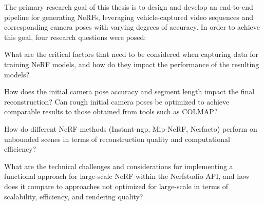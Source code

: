 The primary research goal of this thesis is to design and develop an end-to-end pipeline for generating NeRFs, leveraging vehicle-captured video sequences and corresponding camera poses with varying degrees of accuracy. In order to achieve this goal, four research questions were posed:


\begin{description}[leftmargin=!,labelwidth=\widthof{RQ 1:}]
\item[\textbf{RQ 1:}] What are the critical factors that need to be considered when capturing data for training NeRF models, and how do they impact the performance of the resulting models?

\item[\textbf{RQ 2:}] How does the initial camera pose accuracy and segment length impact the final reconstruction? Can rough initial camera poses be optimized to achieve comparable results to those obtained from tools such as COLMAP?

\item[\textbf{RQ 3:}] How do different NeRF methods (Instant-ngp\cite{muller_instant_2022}, Mip-NeRF\cite{barron_mip-nerf_2021}, Nerfacto\cite{tancik_nerfstudio_2023}) perform on unbounded scenes in terms of reconstruction quality and computational efficiency?

\item[\textbf{RQ 4:}] What are the technical challenges and considerations for implementing a functional approach for large-scale NeRF within the Nerfstudio API, and how does it compare to approaches not optimized for large-scale in terms of scalability, efficiency, and rendering quality?


\end{description}

\begin{comment}
The research goal for this thesis is:
\begin{description}[leftmargin=!,labelwidth=\widthof{RQ:}]
\item[\textbf{RG:}] Design and develop an end-to-end pipeline for generating NeRFs, leveraging vehicle-captured video sequences and corresponding camera poses with varying degrees of accuracy.
\end{description}

In order to achieve this goal, four research questions were posed:
\end{comment}




